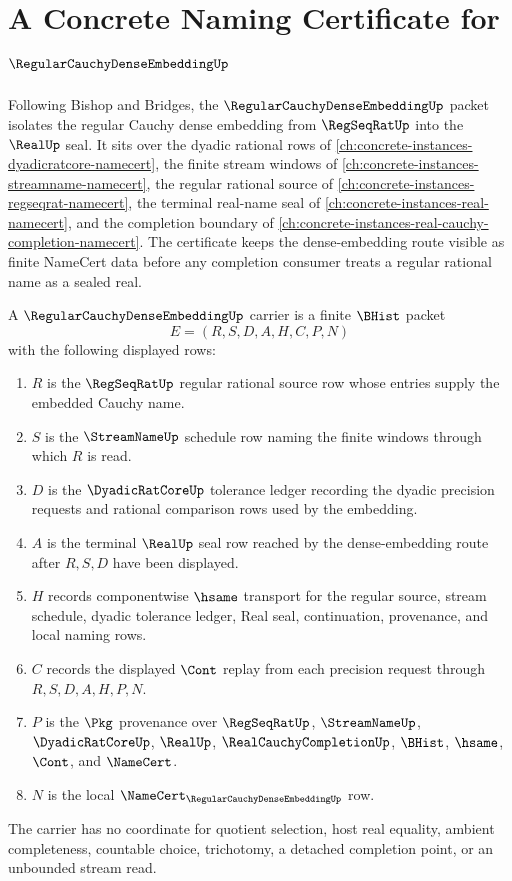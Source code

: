 \chapter{A Concrete Naming Certificate for $\RegularCauchyDenseEmbeddingUp$}
\label{ch:concrete-instances-regular-cauchy-dense-embedding-namecert}

Following Bishop and Bridges, the $\RegularCauchyDenseEmbeddingUp$ packet isolates the regular Cauchy dense embedding from $\RegSeqRatUp$ into the $\RealUp$ seal. It sits over the dyadic rational rows of \autoref{ch:concrete-instances-dyadicratcore-namecert}, the finite stream windows of \autoref{ch:concrete-instances-streamname-namecert}, the regular rational source of \autoref{ch:concrete-instances-regseqrat-namecert}, the terminal real-name seal of \autoref{ch:concrete-instances-real-namecert}, and the completion boundary of \autoref{ch:concrete-instances-real-cauchy-completion-namecert}. The certificate keeps the dense-embedding route visible as finite NameCert data before any completion consumer treats a regular rational name as a sealed real.

\begin{definition}
\label{def:regular-cauchy-dense-embedding-carrier}
A $\RegularCauchyDenseEmbeddingUp$ carrier is a finite $\BHist$ packet
$$
E=(R,S,D,A,H,C,P,N)
$$
with the following displayed rows:
\begin{enumerate}
\item $R$ is the $\RegSeqRatUp$ regular rational source row whose entries supply the embedded Cauchy name.
\item $S$ is the $\StreamNameUp$ schedule row naming the finite windows through which $R$ is read.
\item $D$ is the $\DyadicRatCoreUp$ tolerance ledger recording the dyadic precision requests and rational comparison rows used by the embedding.
\item $A$ is the terminal $\RealUp$ seal row reached by the dense-embedding route after $R,S,D$ have been displayed.
\item $H$ records componentwise $\hsame$ transport for the regular source, stream schedule, dyadic tolerance ledger, Real seal, continuation, provenance, and local naming rows.
\item $C$ records the displayed $\Cont$ replay from each precision request through $R,S,D,A,H,P,N$.
\item $P$ is the $\Pkg$ provenance over $\RegSeqRatUp$, $\StreamNameUp$, $\DyadicRatCoreUp$, $\RealUp$, $\RealCauchyCompletionUp$, $\BHist$, $\hsame$, $\Cont$, and $\NameCert$.
\item $N$ is the local $\NameCert_{\RegularCauchyDenseEmbeddingUp}$ row.
\end{enumerate}
The carrier has no coordinate for quotient selection, host real equality, ambient completeness, countable choice, trichotomy, a detached completion point, or an unbounded stream read.
\end{definition}

